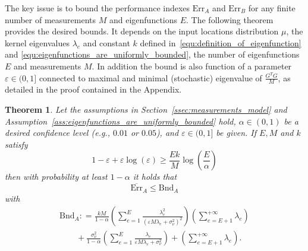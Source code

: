 \documentclass[10pt,twocolumn,twoside]{IEEEtran}					%
\newcounter{generalCounter}
\theoremstyle	{plain}
\newtheorem		{theorem}		[generalCounter]	{Theorem}
\newcommand{\DefinedAs}			[0]	{\mathrel{\mathop:}=}
\newcommand	{\Assumption}			[0]	{Assumption}
\newcommand	{\Section}				[0]	{Section}
\begin{document}
The key issue is to bound the performance indexes $\mathrm{Err}_{A}$ and $\mathrm{Err}_{B}$ for any finite number of measurements $M$ and eigenfunctions $E$. The following theorem provides the desired bounds. It depends on the input locations
distribution $\mu$, the kernel eigenvalues $\lambda_{e}$ and constant $k$ defined 
in~\eqref{equ:definition_of_eigenfunction} and \eqref{equ:eigenfunctions_are_uniformly_bounded},
 the number of eigenfunctions $E$ and measurements $M$. In addition the bound is
also function of a parameter $\varepsilon \in (0, 1]$ connected to maximal and minimal (stochastic) eigenvalue of $\frac{G^{T} G}{M}$, 
as detailed in the proof contained in the Appendix. 
%
\begin{theorem}
	Let the assumptions in \Section~\ref{ssec:measurements_model} and \Assumption~\ref{ass:eigenfunctions_are_uniformly_bounded} hold, $\alpha \in (0, 1)$ be a desired confidence level (e.g., $0.01$ or $0.05$), and $\varepsilon \in (0, 1]$ be given. If $E, M$ and $k$ satisfy
	\begin{equation}
		1 - \varepsilon + \varepsilon \log(\varepsilon)
		\geq
		\frac{Ek}{M} \log\left(\frac{E}{\alpha}\right)
		\label{equ:condition_on_varepsilon_for_estimator_A}
	\end{equation}
	then with probability at least $1-\alpha$ it holds that
	\begin{equation}
		\overline{\mathrm{Err}}_{A} 
		\leq
		\mathrm{Bnd}_{A}
		\label{equ:definition_of_bound_A}
	\end{equation}
	with
	\begin{equation}
		\begin{array}{l}
			\displaystyle
			\mathrm{Bnd}_{A}
			\DefinedAs
			\frac{k M}{1-\alpha}
			\left(
				\sum_{e = 1}^{E}
				\frac{\lambda^2_{e}}{(\varepsilon M \lambda_e + \sigma^{2}_{\nu})^2}
			\right)
			\left(
				\sum_{e = E + 1}^{+\infty} \lambda_{e}
			\right) \\
			\displaystyle \qquad
			+
			\frac{\sigma^{2}_{\nu}}{1-\alpha}
			\left(
				\sum_{e = 1}^{E}
				\frac{\lambda_e}{\varepsilon M \lambda_e + \sigma^{2}_{\nu}}
			\right)
			+
			\left(
				\sum_{e = E + 1}^{+\infty} \lambda_{e}
			\right)
			.
		\end{array}
		\label{equ:value_of_bound_A}
	\end{equation}


\end{theorem}
\end{document}
